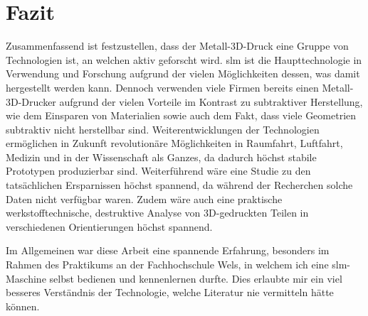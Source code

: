 \documentclass[../main.tex]{subfiles}
\begin{document}
\section{Fazit}
Zusammenfassend ist festzustellen, dass der Metall-3D-Druck eine Gruppe von Technologien ist, an welchen aktiv geforscht wird. \acrshort{slm} ist die Haupttechnologie in Verwendung und Forschung aufgrund der vielen Möglichkeiten dessen, was damit hergestellt werden kann.
Dennoch verwenden viele Firmen bereits einen Metall-3D-Drucker aufgrund der vielen Vorteile im Kontrast zu subtraktiver Herstellung, wie dem Einsparen von Materialien sowie auch dem Fakt, dass viele Geometrien subtraktiv nicht herstellbar sind. 
Weiterentwicklungen der Technologien ermöglichen in Zukunft revolutionäre Möglichkeiten in Raumfahrt, Luftfahrt, Medizin und in der Wissenschaft als Ganzes, da dadurch höchst stabile Prototypen produzierbar sind.\parencite{Singh2020} 
Weiterführend wäre eine Studie zu den tatsächlichen Ersparnissen höchst spannend, da während der Recherchen solche Daten nicht verfügbar waren. Zudem wäre auch eine praktische werkstofftechnische, destruktive Analyse von 3D-gedruckten Teilen in verschiedenen Orientierungen höchst spannend.

Im Allgemeinen war diese Arbeit eine spannende Erfahrung, besonders im Rahmen des Praktikums an der Fachhochschule Wels, in welchem ich eine \acrshort{slm}-Maschine selbst bedienen und kennenlernen durfte. Dies erlaubte mir ein viel besseres Verständnis der Technologie, welche Literatur nie vermitteln hätte können.
\end{document}
